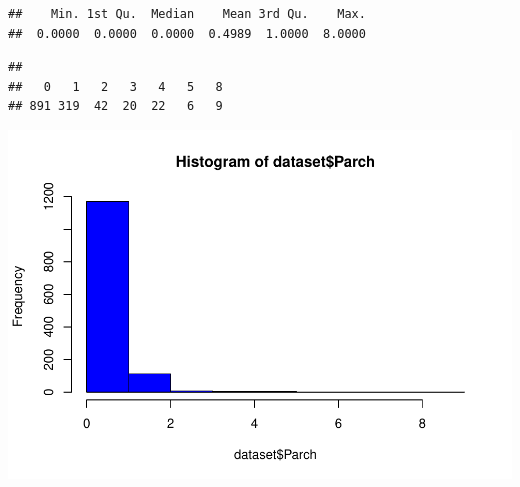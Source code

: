 \documentclass[
]{article}
\newenvironment{Shaded}{\begin{snugshade}}{\end{snugshade}}
\newcommand{\AttributeTok}[1]{\textcolor[rgb]{0.80,0.80,0.80}{#1}}
\newcommand{\CommentTok}[1]{\textcolor[rgb]{0.50,0.62,0.50}{#1}}
\newcommand{\FunctionTok}[1]{\textcolor[rgb]{0.94,0.94,0.56}{#1}}
\newcommand{\NormalTok}[1]{\textcolor[rgb]{0.80,0.80,0.80}{#1}}
\newcommand{\SpecialCharTok}[1]{\textcolor[rgb]{0.86,0.64,0.64}{#1}}
\newcommand{\StringTok}[1]{\textcolor[rgb]{0.80,0.58,0.58}{#1}}
\begin{document}
\begin{Shaded}
\end{Shaded}

\begin{verbatim}
##    Min. 1st Qu.  Median    Mean 3rd Qu.    Max. 
##  0.0000  0.0000  0.0000  0.4989  1.0000  8.0000
\end{verbatim}

\begin{Shaded}
\end{Shaded}

\begin{verbatim}
## 
##   0   1   2   3   4   5   8 
## 891 319  42  20  22   6   9
\end{verbatim}

\begin{Shaded}
\end{Shaded}

\includegraphics{titanic-analysis_files/figure-latex/unnamed-chunk-14-5.pdf}
\end{document}
